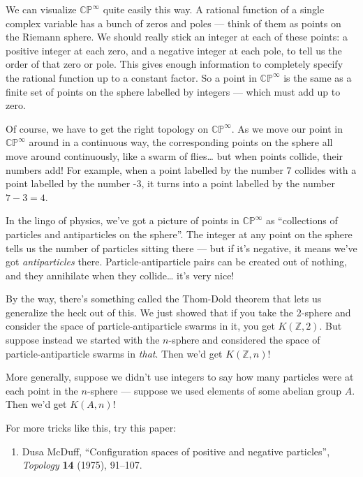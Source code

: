 \documentclass{article}
\def\tightlist{}
\begin{document}
We can visualize \(\mathbb{CP}^\infty\) quite easily this way. A
rational function of a single complex variable has a bunch of zeros and
poles --- think of them as points on the Riemann sphere. We should
really stick an integer at each of these points: a positive integer at
each zero, and a negative integer at each pole, to tell us the order of
that zero or pole. This gives enough information to completely specify
the rational function up to a constant factor. So a point in
\(\mathbb{CP}^\infty\) is the same as a finite set of points on the
sphere labelled by integers --- which must add up to zero.

Of course, we have to get the right topology on \(\mathbb{CP}^\infty\).
As we move our point in \(\mathbb{CP}^\infty\) around in a continuous
way, the corresponding points on the sphere all move around
continuously, like a swarm of flies\ldots{} but when points collide,
their numbers add! For example, when a point labelled by the number 7
collides with a point labelled by the number -3, it turns into a point
labelled by the number \(7 - 3 = 4\).

In the lingo of physics, we've got a picture of points in
\(\mathbb{CP}^\infty\) as ``collections of particles and antiparticles
on the sphere''. The integer at any point on the sphere tells us the
number of particles sitting there --- but if it's negative, it means
we've got \emph{antiparticles} there. Particle-antiparticle pairs can be
created out of nothing, and they annihilate when they collide\ldots{}
it's very nice!

By the way, there's something called the Thom-Dold theorem that lets us
generalize the heck out of this. We just showed that if you take the
2-sphere and consider the space of particle-antiparticle swarms in it,
you get \(K(\mathbb{Z},2)\). But suppose instead we started with the
\(n\)-sphere and considered the space of particle-antiparticle swarms in
\emph{that}. Then we'd get \(K(\mathbb{Z},n)\)!

More generally, suppose we didn't use integers to say how many particles
were at each point in the \(n\)-sphere --- suppose we used elements of
some abelian group \(A\). Then we'd get \(K(A,n)\)!

For more tricks like this, try this paper:

\begin{enumerate}
\def\labelenumi{\arabic{enumi})}
\setcounter{enumi}{2}
\tightlist
\item
  Dusa McDuff, ``Configuration spaces of positive and negative
  particles'', \emph{Topology} \textbf{14} (1975), 91--107.
\end{enumerate}
\end{document}
